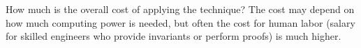 \documentclass[landscape, a4paper]{article}
\begin{document}
\begin{minipage}[t]{0.2\linewidth}
\begin{betterlist}
\begin{betterlist}
			\item How much is the overall cost of applying the technique? The cost may depend on how much computing power is needed, but often the cost for human labor (salary for skilled engineers who provide invariants or perform proofs) is much higher.

		\end{betterlist}
	\end{betterlist}
\end{minipage}
\end{document}
